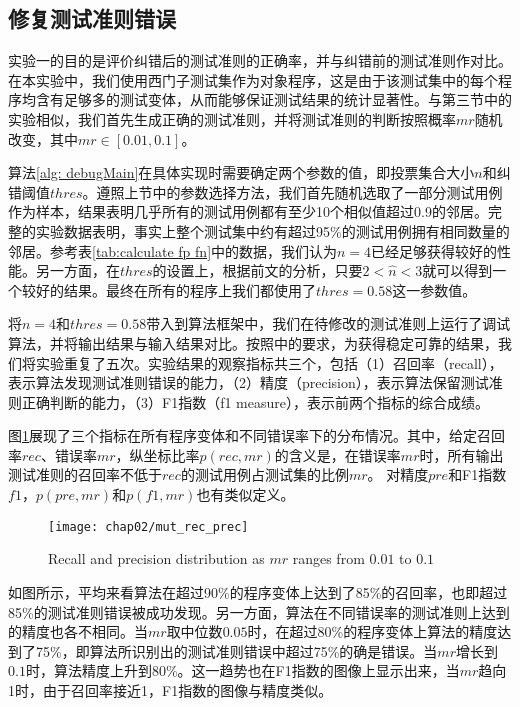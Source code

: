 \subsection{修复测试准则错误}
\label{subsection: repair test oracle}
实验一的目的是评价纠错后的测试准则的正确率，并与纠错前的测试准则作对比。在本实验中，我们使用西门子测试集作为对象程序，这是由于该测试集中的每个程序均含有足够多的测试变体，从而能够保证测试结果的统计显著性。与第三节中的实验相似，我们首先生成正确的测试准则，并将测试准则的判断按照概率$mr$随机改变，其中$mr \in [0.01, 0.1]$。

算法\ref{alg: debugMain}在具体实现时需要确定两个参数的值，即投票集合大小$n$和纠错阈值$thres$。遵照上节中的参数选择方法，我们首先随机选取了一部分测试用例作为样本，结果表明几乎所有的测试用例都有至少10个相似值超过0.9的邻居。完整的实验数据表明，事实上整个测试集中约有超过95\%的测试用例拥有相同数量的邻居。参考表\ref{tab:calculate fp fn}中的数据，我们认为$n=4$已经足够获得较好的性能。另一方面，在$thres$的设置上，根据前文的分析，只要$2 < \hat{n} < 3$就可以得到一个较好的结果。最终在所有的程序上我们都使用了$thres = 0.58$这一参数值。

将$n = 4$和$thres = 0.58$带入到算法框架中，我们在待修改的测试准则上运行了调试算法，并将输出结果与输入结果对比。按照\cite{Steimann:2013:TVV:2483760.2483767}中的要求，为获得稳定可靠的结果，我们将实验重复了五次。实验结果的观察指标共三个，包括（1）召回率（recall），表示算法发现测试准则错误的能力，（2）精度（precision），表示算法保留测试准则正确判断的能力，（3）F1指数（f1 measure），表示前两个指标的综合成绩。

图\ref{fig:mut_rec_prec_cropped}展现了三个指标在所有程序变体和不同错误率下的分布情况。其中，给定召回率$rec$、错误率$mr$，纵坐标比率$p(rec, mr)$的含义是，在错误率$mr$时，所有输出测试准则的召回率不低于$rec$的测试用例占测试集的比例$mr$。 对精度$pre$和F1指数$f1$，$p(pre, mr)$和$p(f1, mr)$也有类似定义。
\begin{figure}
	\centering
	\texttt{[image: chap02/mut\_rec\_prec]}
	\caption{Recall and precision distribution as $mr$ ranges from $0.01$ to $0.1$}
	\label{fig:mut_rec_prec_cropped}
\end{figure}
如图所示，平均来看算法在超过90\%的程序变体上达到了85\%的召回率，也即超过85\%的测试准则错误被成功发现。另一方面，算法在不同错误率的测试准则上达到的精度也各不相同。当$mr$取中位数$0.05$时，在超过80\%的程序变体上算法的精度达到了75\%，即算法所识别出的测试准则错误中超过75\%的确是错误。当$mr$增长到$0.1$时，算法精度上升到80\%。这一趋势也在F1指数的图像上显示出来，当$mr$趋向1时，由于召回率接近1，F1指数的图像与精度类似。

